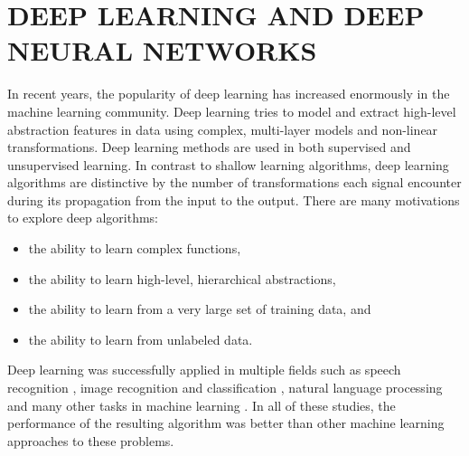 \chapter{DEEP LEARNING AND DEEP NEURAL NETWORKS}
\thispagestyle{fancy}

	In recent years, the popularity of deep learning has increased enormously in the machine learning
community. Deep learning tries to model and extract high-level abstraction features in data using
complex, multi-layer models and non-linear transformations. Deep learning methods are used
in both supervised and unsupervised learning. In contrast to shallow learning algorithms, deep
learning algorithms are distinctive by the number of transformations each signal encounter during
its propagation from the input to the output. There are many motivations to explore deep
algorithms:
\begin{itemize}
    \item the ability to learn complex functions,
    \item the ability to learn high-level, hierarchical abstractions,
    \item the ability to learn from a very large set of training data, and
    \item the ability to learn from unlabeled data.
\end{itemize}
Deep learning was successfully applied in multiple fields such as speech recognition \cite{socher}, image
recognition and classification \cite{Krizhevsky:2017:ICD:3098997.3065386}, natural language processing \cite{socher} and many other tasks in
machine learning \cite{dengli}. In all of these studies, the performance of the resulting algorithm was better
than other machine learning approaches to these problems.

